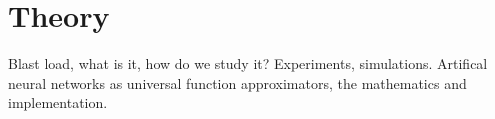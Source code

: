 \chapter{Theory}\label{chapter:Theory}

Blast load, what is it, how do we study it?
Experiments, simulations.
Artifical neural networks as universal function approximators, the mathematics and implementation.
